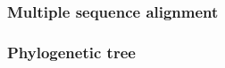 \documentclass[12pt]{article}
\begin{document}
\newpage

%
%
\part{}

%
%
\setcounter{figure}{0}
\setcounter{table}{0}
\section{Multiple sequence alignment}



%
%
\setcounter{figure}{0}
\setcounter{table}{0}
\section{Phylogenetic tree}





\end{document}
